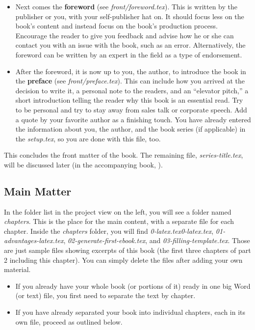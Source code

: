 \begin{itemize}
    \item Next comes the \textbf{foreword} (see \textit{front/foreword.tex}). This is written by the publisher or you, with your self-publisher hat on. It should focus less on the book's content and instead focus on the book's production process. Encourage the reader to give you feedback and advise how he or she can contact you with an issue with the book, such as an error. Alternatively, the foreword can be written by an expert in the field as a type of endorsement. 

    \item After the foreword, it is now up to you, the author, to introduce the book in the \textbf{preface} (see \textit{front/preface.tex}). This can include how you arrived at the decision to write it, a personal note to the readers, and an ``elevator pitch,'' a short introduction telling the reader why this book is an essential read. Try to be personal and try to stay away from sales talk or corporate speech. Add a quote by your favorite author as a finishing touch. You have already entered the information about you, the author, and the book series (if applicable) in the \textit{setup.tex}, so you are done with this file, too.

\end{itemize}

This concludes the front matter of the book. The remaining file, \textit{series-title.tex}, will be discussed later (in the accompanying book, ).


\newpage\subsection{Main Matter}\label{mainmatter:sec}

In the folder list in the project view on the left, you will see a folder named \textit{chapters}. This is the place for the main content, with a separate file for each chapter. Inside the \textit{chapters} folder, you will find \textit{0-latex.tex}\textit{0-latex.tex}, \textit{01-advantages-latex.tex}, \textit{02-generate-first-ebook.tex}, and \textit{03-filling-template.tex}. Those are just sample files showing excerpts of this book (the first three chapters of part 2 including this chapter). You can simply delete the files after adding your own material.

\begin{itemize}

\item If you already have your whole book (or portions of it) ready in one big Word (or text) file, you first need to separate the text by chapter.

\item If you have already separated your book into individual chapters, each in its own file, proceed as outlined below.

\end{itemize}

